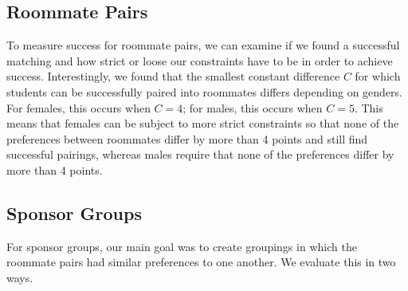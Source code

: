 \documentclass[letterpaper]{article}
\begin{document}
\subsection{Roommate Pairs}
To measure success for roommate pairs, we can examine if we found a successful matching and how strict or loose our constraints have to be in order to achieve success.
Interestingly, we found that the smallest constant difference $C$ for which students can be successfully paired into roommates differs depending on genders. For females, this occurs when $C = 4$; for males, this occurs when $C=5$. This means that females can be subject to more strict constraints so that none of the preferences between roommates differ by more than 4 points and still find successful pairings, whereas males require that none of the preferences differ by more than 4 points.

\subsection{Sponsor Groups}

For sponsor groups, our main goal was to create groupings in which the roommate pairs had similar preferences to one another. We evaluate this in two ways. 
\end{document}
